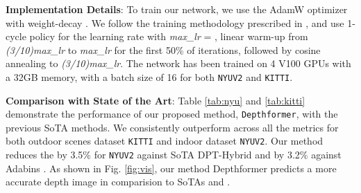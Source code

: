 \documentclass{article}
\newcommand{\myfirstpara}[1]{\noindent \textbf{#1}:}
\newcommand{\mypara}[1]{\vspace{0.5em} \myfirstpara{#1}}
\newcommand{\Depthformer}{\texttt{Depthformer}\xspace}
\newcommand{\KITTI}{\texttt{KITTI}\xspace}
\newcommand{\NYU}{\texttt{NYUV2}\xspace}
\begin{document}
\mypara{Implementation Details} 
To train our network, we use the AdamW optimizer \cite{adamw} with weight-decay . We follow the training methodology prescribed in \cite{onecycle}, and use 1-cycle policy for the learning rate with \textit{max\_lr} = , linear warm-up from \textit{(3/10)max\_lr} to \textit{max\_lr} for the first 50\% of iterations, followed by cosine annealing to \textit{(3/10)max\_lr}. The network has been trained on 4 V100 GPUs with a 32GB memory, with a batch size of 16 for both \NYU and \KITTI. 

\myfirstpara{Comparison with State of the Art}
Table \ref{tab:nyu} and \ref{tab:kitti} demonstrate the performance of our proposed method, \Depthformer, with the previous SoTA methods. We consistently outperform across all the metrics for both outdoor scenes dataset \KITTI and indoor dataset \NYU. Our method reduces the  by 3.5\% for \NYU against SoTA DPT-Hybrid \cite{dense} and by 3.2\% against Adabins \cite{adabins}. As shown in Fig. \ref{fig:vis}, our method Depthformer predicts a more accurate depth image in comparision to SoTAs \cite{dense} and \cite{adabins}.
\end{document}
